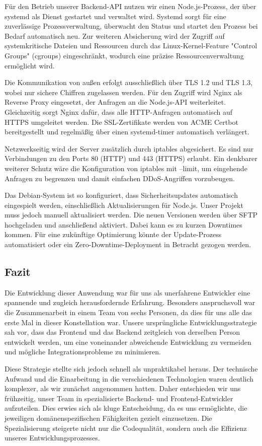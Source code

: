 \documentclass[a4paper,12pt]{article}
\begin{document}
Für den Betrieb unserer Backend-API nutzen wir einen Node.js-Prozess, der über
systemd als Dienst gestartet und verwaltet wird. Systemd sorgt für eine
zuverlässige Prozessverwaltung, überwacht den Status und startet den Prozess
bei Bedarf automatisch neu. Zur weiteren Absicherung wird der Zugriff auf
systemkritische Dateien und Ressourcen durch das Linux-Kernel-Feature "Control
Groups" (cgroups) eingeschränkt, wodurch eine präzise Ressourcenverwaltung
ermöglicht wird.

Die Kommunikation von außen erfolgt ausschließlich über TLS 1.2 und TLS 1.3,
wobei nur sichere Chiffren zugelassen werden. Für den Zugriff wird Nginx als
Reverse Proxy eingesetzt, der Anfragen an die Node.js-API weiterleitet.
Gleichzeitig sorgt Nginx dafür, dass alle HTTP-Anfragen automatisch auf HTTPS
umgeleitet werden. Die SSL-Zertifikate werden von ACME Certbot bereitgestellt
und regelmäßig über einen systemd-timer automatisch verlängert.

Netzwerkseitig wird der Server zusätzlich durch iptables abgesichert. Es sind
nur Verbindungen zu den Ports 80 (HTTP) und 443 (HTTPS) erlaubt. Ein denkbarer
weiterer Schutz wäre die Konfiguration von iptables mit --limit, um eingehende
Anfragen zu begrenzen und damit einfachen DDoS-Angriffen vorzubeugen.

Das Debian-System ist so konfiguriert, dass Sicherheitsupdates automatisch
eingespielt werden, einschließlich Aktualisierungen für Node.js. Unser Projekt
muss jedoch manuell aktualisiert werden. Die neuen Versionen werden über SFTP
hochgeladen und anschließend aktiviert. Dabei kann es zu kurzen Downtimes
kommen. Für eine zukünftige Optimierung könnte der Update-Prozess automatisiert
oder ein Zero-Downtime-Deployment in Betracht gezogen werden.

\subsection{Fazit} Die Entwicklung dieser Anwendung war für uns als unerfahrene
Entwickler eine spannende und zugleich herausfordernde Erfahrung. Besonders
anspruchsvoll war die Zusammenarbeit in einem Team von sechs Personen, da dies
für uns alle das erste Mal in dieser Konstellation war. Unsere ursprüngliche
Entwicklungsstrategie sah vor, dass das Frontend und das Backend zeitgleich von
derselben Person entwickelt werden, um eine voneinander abweichende Entwicklung
zu vermeiden und mögliche Integrationsprobleme zu minimieren.

Diese Strategie stellte sich jedoch schnell als unpraktikabel heraus. Der
technische Aufwand und die Einarbeitung in die verschiedenen Technologien waren
deutlich komplexer, als wir zunächst angenommen hatten. Daher entschieden wir
uns frühzeitig, unser Team in spezialisierte Backend- und Frontend-Entwickler
aufzuteilen. Dies erwies sich als kluge Entscheidung, da es uns ermöglichte,
die jeweiligen domänenspezifischen Fähigkeiten gezielt einzusetzen. Die
Spezialisierung steigerte nicht nur die Codequalität, sondern auch die
Effizienz unseres Entwicklungsprozesses.
\end{document}
